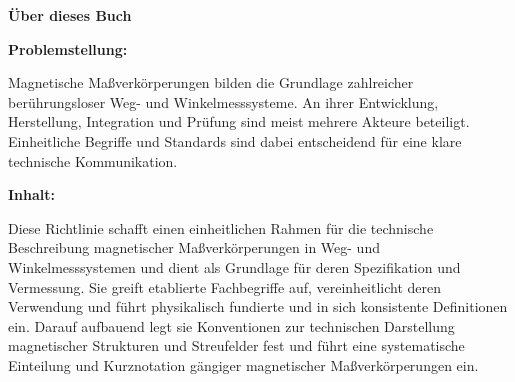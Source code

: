 

\clearpage

\ifodd\value{page}
  \thispagestyle{empty}
  \null
  \clearpage
\fi


\thispagestyle{empty}

\vspace*{-5mm}

{
\fontsize{18pt}{22pt}\selectfont \bfseries\sffamily
Über dieses Buch
\par
}

\vspace{6mm}

{\fontsize{11pt}{16pt}\selectfont\bfseries\sffamily Problemstellung:\\}
{\fontsize{11pt}{16pt}\selectfont\sffamily
Magnetische Maßverkörperungen bilden die Grundlage zahlreicher berührungsloser Weg- und Winkelmesssysteme. An ihrer Entwicklung, Herstellung, Integration und Prüfung sind meist mehrere Akteure beteiligt. Einheitliche Begriffe und Standards sind dabei entscheidend für eine klare technische Kommunikation.
\par
}

\vspace{3mm}

{\fontsize{11pt}{16pt}\selectfont\bfseries\sffamily Inhalt:\\}
{\fontsize{11pt}{16pt}\selectfont\sffamily
Diese Richtlinie schafft einen einheitlichen Rahmen für die technische Beschreibung magnetischer Maßverkörperungen in Weg- und Winkelmesssystemen und dient als Grundlage für deren Spezifikation und Vermessung. Sie greift etablierte Fachbegriffe auf, vereinheitlicht deren Verwendung und führt physikalisch fundierte und in sich konsistente Definitionen ein. Darauf aufbauend legt sie Konventionen zur technischen Darstellung magnetischer Strukturen und Streufelder fest und führt eine systematische Einteilung und Kurznotation gängiger magnetischer Maßverkörperungen ein.
\par
}

\vspace{3mm}

